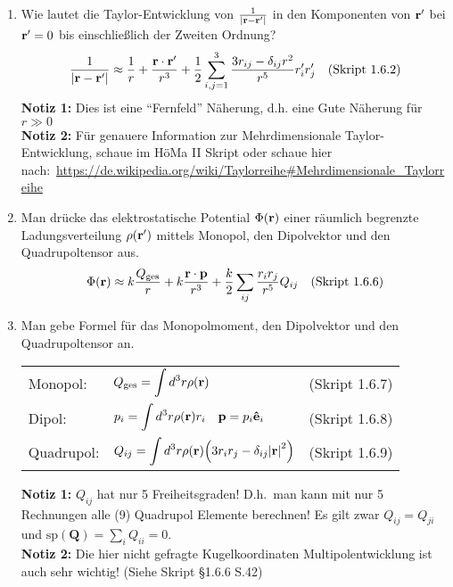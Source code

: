 \documentclass{scrartcl}
\newcommand{\rr}[1]{\frac{#1}{\abs{\vb{r}-\vb{r}'}}}
\newcommand{\ds}{\displaystyle}
\newcommand{\sref}[1]{(Skript #1)}
\newcommand{\smref}[1]{\quad\text{(Skript #1)}}
\begin{document}
  \begin{enumerate}
    \item Wie lautet die Taylor-Entwicklung von $\rr{1}$ in den Komponenten
          von $\vb r'$ bei $\vb r'=0$ bis einschließlich der Zweiten
          Ordnung?
          $$ 
          \rr{1}\approx \frac{1}{r}+\frac{\vb r\cdot\vb r'}{r^3} +
          \frac{1}{2}\sum_{i,j=1}^3\frac{3r_{ij}-\delta_{ij}r^2}{r^5}
          r_i'r_j'
          \quad\text{(Skript 1.6.2)}$$
          \textbf{Notiz 1:} Dies ist eine ``Fernfeld'' Näherung, d.h. 
          eine Gute Näherung für $r\gg 0$\\
          \textbf{Notiz 2:} Für genauere Information zur Mehrdimensionale
          Taylor-Entwicklung, schaue im HöMa II Skript oder schaue hier 
          nach:~\url{https://de.wikipedia.org/wiki/Taylorreihe#Mehrdimensionale_Taylorreihe}

    \item Man drücke das elektrostatische Potential $\Phi(\vb r)$ einer
          räumlich begrenzte Ladungsverteilung $\rho(\vb r')$ mittels
          Monopol, den Dipolvektor und den Quadrupoltensor aus.
          $$
          \Phi(\vb r)\approx k\frac{Q_\text{ges}}{r} +
          k\frac{\vb r\cdot \vb p}{r^3} +
          \frac{k}{2} \sum_{ij}\frac{r_ir_j}{r^5}Q_{ij}
          \smref{1.6.6}$$

    \item Man gebe Formel für das Monopolmoment, den Dipolvektor und den
          Quadrupoltensor an.
          \begin{center}
          \begin{tabular}{lll}
            Monopol:    & $\ds Q_{\text{ges}}=\int d^3r\rho(\vb r)$
                          &\sref{1.6.7}\\
            Dipol:      & $\ds p_i=\int d^3r\rho(\vb r)r_i
                          \quad\vb p=p_i\vu{e}_i $
                          &\sref{1.6.8}\\
            Quadrupol:  & $\ds Q_{ij}=\int d^3r\rho(\vb r)
            \qty(3r_ir_j - \delta_{ij}\abs{\vb r}^2)$
                          &\sref{1.6.9}\\
          \end{tabular}
          \end{center}
          \textbf{Notiz 1:} $Q_{ij}$ hat nur 5 Freiheitsgraden! D.h.\ man kann           mit nur 5 Rechnungen alle (9) Quadrupol Elemente berechnen! Es
          gilt zwar $Q_{ij}=Q_{ji}$ und 
          $\text{sp}(\bm Q)=\sum_i Q_{ii}=0$.\\
          \textbf{Notiz 2:} Die hier nicht gefragte Kugelkoordinaten
          Multipolentwicklung ist auch sehr wichtig! 
          (Siehe Skript §1.6.6 S.42)


\end{enumerate}
\end{document}
